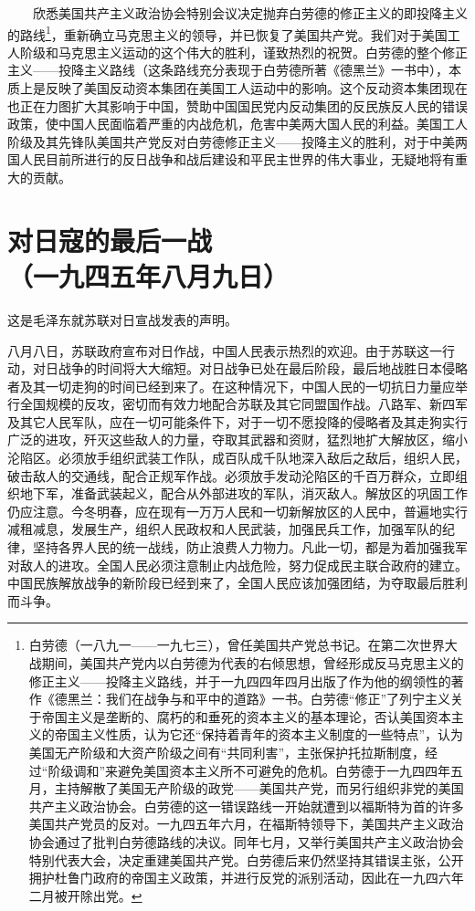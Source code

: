 \documentclass[cn,11pt,chinese]{elegantbook}
\def\myformat#1{\hfil\hfil #1}
\begin{document}
　　欣悉美国共产主义政治协会特别会议决定抛弃白劳德的修正主义的即投降主义的路线\footnote[1]{ 白劳德（一八九一——一九七三），曾任美国共产党总书记。在第二次世界大战期间，美国共产党内以白劳德为代表的右倾思想，曾经形成反马克思主义的修正主义——投降主义路线，并于一九四四年四月出版了作为他的纲领性的著作《德黑兰：我们在战争与和平中的道路》一书。白劳德“修正”了列宁主义关于帝国主义是垄断的、腐朽的和垂死的资本主义的基本理论，否认美国资本主义的帝国主义性质，认为它还“保持着青年的资本主义制度的一些特点”，认为美国无产阶级和大资产阶级之间有“共同利害”，主张保护托拉斯制度，经过“阶级调和”来避免美国资本主义所不可避免的危机。白劳德于一九四四年五月，主持解散了美国无产阶级的政党——美国共产党，而另行组织非党的美国共产主义政治协会。白劳德的这一错误路线一开始就遭到以福斯特为首的许多美国共产党员的反对。一九四五年六月，在福斯特领导下，美国共产主义政治协会通过了批判白劳德路线的决议。同年七月，又举行美国共产主义政治协会特别代表大会，决定重建美国共产党。白劳德后来仍然坚持其错误主张，公开拥护杜鲁门政府的帝国主义政策，并进行反党的派别活动，因此在一九四六年二月被开除出党。}，重新确立马克思主义的领导，并已恢复了美国共产党。我们对于美国工人阶级和马克思主义运动的这个伟大的胜利，谨致热烈的祝贺。白劳德的整个修正主义——投降主义路线（这条路线充分表现于白劳德所著《德黑兰》一书中），本质上是反映了美国反动资本集团在美国工人运动中的影响。这个反动资本集团现在也正在力图扩大其影响于中国，赞助中国国民党内反动集团的反民族反人民的错误政策，使中国人民面临着严重的内战危机，危害中美两大国人民的利益。美国工人阶级及其先锋队美国共产党反对白劳德修正主义——投降主义的胜利，对于中美两国人民目前所进行的反日战争和战后建设和平民主世界的伟大事业，无疑地将有重大的贡献。\\
\newpage\section*{\myformat{对日寇的最后一战}\\\myformat{（一九四五年八月九日）}}
\begin{introduction}\item  这是毛泽东就苏联对日宣战发表的声明。\end{introduction}
八月八日，苏联政府宣布对日作战，中国人民表示热烈的欢迎。由于苏联这一行动，对日战争的时间将大大缩短。对日战争已处在最后阶段，最后地战胜日本侵略者及其一切走狗的时间已经到来了。在这种情况下，中国人民的一切抗日力量应举行全国规模的反攻，密切而有效力地配合苏联及其它同盟国作战。八路军、新四军及其它人民军队，应在一切可能条件下，对于一切不愿投降的侵略者及其走狗实行广泛的进攻，歼灭这些敌人的力量，夺取其武器和资财，猛烈地扩大解放区，缩小沦陷区。必须放手组织武装工作队，成百队成千队地深入敌后之敌后，组织人民，破击敌人的交通线，配合正规军作战。必须放手发动沦陷区的千百万群众，立即组织地下军，准备武装起义，配合从外部进攻的军队，消灭敌人。解放区的巩固工作仍应注意。今冬明春，应在现有一万万人民和一切新解放区的人民中，普遍地实行减租减息，发展生产，组织人民政权和人民武装，加强民兵工作，加强军队的纪律，坚持各界人民的统一战线，防止浪费人力物力。凡此一切，都是为着加强我军对敌人的进攻。全国人民必须注意制止内战危险，努力促成民主联合政府的建立。中国民族解放战争的新阶段已经到来了，全国人民应该加强团结，为夺取最后胜利而斗争。\\
\newpage
\end{document}
